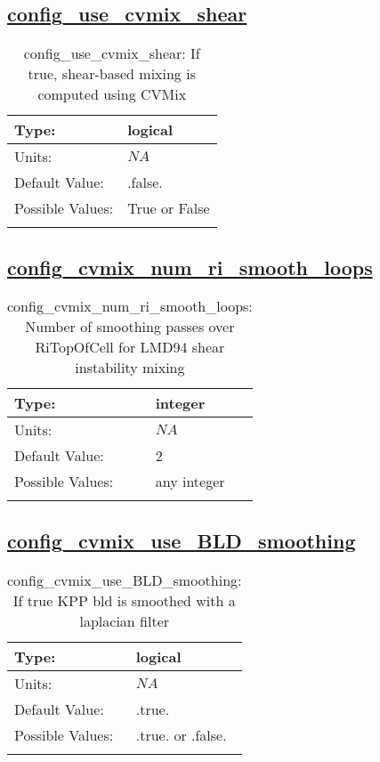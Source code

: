 \subsection[config\_use\_cvmix\_shear]{\hyperref[sec:nm_tab_cvmix]{config\_use\_cvmix\_shear}}
\label{subsec:nm_sec_config_use_cvmix_shear}
\begin{center}
\begin{longtable}{| p{2.0in} || p{4.0in} |}
    \hline
    Type: & logical \\
    \hline
    Units: & $NA$ \\
    \hline
    Default Value: & .false. \\
    \hline
    Possible Values: & True or False \\
    \hline
    \caption{config\_use\_cvmix\_shear: If true, shear-based mixing is computed using CVMix}
\end{longtable}
\end{center}
\subsection[config\_cvmix\_num\_ri\_smooth\_loops]{\hyperref[sec:nm_tab_cvmix]{config\_cvmix\_num\_ri\_smooth\_loops}}
\label{subsec:nm_sec_config_cvmix_num_ri_smooth_loops}
\begin{center}
\begin{longtable}{| p{2.0in} || p{4.0in} |}
    \hline
    Type: & integer \\
    \hline
    Units: & $NA$ \\
    \hline
    Default Value: & 2 \\
    \hline
    Possible Values: & any integer \\
    \hline
    \caption{config\_cvmix\_num\_ri\_smooth\_loops: Number of smoothing passes over RiTopOfCell for LMD94 shear instability mixing}
\end{longtable}
\end{center}
\subsection[config\_cvmix\_use\_BLD\_smoothing]{\hyperref[sec:nm_tab_cvmix]{config\_cvmix\_use\_BLD\_smoothing}}
\label{subsec:nm_sec_config_cvmix_use_BLD_smoothing}
\begin{center}
\begin{longtable}{| p{2.0in} || p{4.0in} |}
    \hline
    Type: & logical \\
    \hline
    Units: & $NA$ \\
    \hline
    Default Value: & .true. \\
    \hline
    Possible Values: & .true. or .false. \\
    \hline
    \caption{config\_cvmix\_use\_BLD\_smoothing: If true KPP bld is smoothed with a laplacian filter}
\end{longtable}
\end{center}
